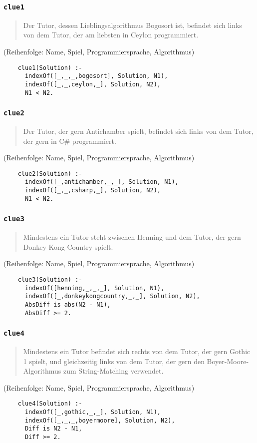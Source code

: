 \documentclass{beamer}
\begin{document}
\begin{frame}[fragile]
  \prolog
  \frametitle{\lstinline{clue1}}
  \begin{quote}
    Der Tutor, dessen Lieblingsalgorithmus Bogosort ist, befindet sich links von dem Tutor, der am liebsten in Ceylon programmiert.
  \end{quote}
  \small{(Reihenfolge: Name, Spiel, Programmiersprache, Algorithmus)}
  \pause
  \begin{lstlisting}
    clue1(Solution) :-
      indexOf([_,_,_,bogosort], Solution, N1),
      indexOf([_,_,ceylon,_], Solution, N2),
      N1 < N2.
  \end{lstlisting}
\end{frame}

\begin{frame}[fragile]
  \prolog
  \frametitle{\lstinline{clue2}}
  \begin{quote}
    Der Tutor, der gern Antichamber spielt, befindet sich links von dem Tutor, der gern in C\# programmiert.
  \end{quote}
  \small{(Reihenfolge: Name, Spiel, Programmiersprache, Algorithmus)}
  \pause
  \begin{lstlisting}
    clue2(Solution) :-
      indexOf([_,antichamber,_,_], Solution, N1),
      indexOf([_,_,csharp,_], Solution, N2),
      N1 < N2.
  \end{lstlisting}
\end{frame}

\begin{frame}[fragile]
  \prolog
  \frametitle{\lstinline{clue3}}
  \begin{quote}
    Mindestens ein Tutor steht zwischen Henning und dem Tutor, der gern Donkey Kong Country spielt.    
  \end{quote}
  \small{(Reihenfolge: Name, Spiel, Programmiersprache, Algorithmus)}
  \pause
  \begin{lstlisting}
    clue3(Solution) :-
	  indexOf([henning,_,_,_], Solution, N1),
	  indexOf([_,donkeykongcountry,_,_], Solution, N2),
	  AbsDiff is abs(N2 - N1),
	  AbsDiff >= 2.
  \end{lstlisting}
\end{frame}

\begin{frame}[fragile]
  \prolog
  \frametitle{\lstinline{clue4}}
  \begin{quote}
    Mindestens ein Tutor befindet sich rechts von dem Tutor, der gern Gothic 1 spielt, und gleichzeitig links von dem Tutor, der gern den Boyer-Moore-Algorithmus zum String-Matching verwendet.
  \end{quote}
  \small{(Reihenfolge: Name, Spiel, Programmiersprache, Algorithmus)}
  \pause
  \begin{lstlisting}
    clue4(Solution) :-
	  indexOf([_,gothic,_,_], Solution, N1),
	  indexOf([_,_,_,boyermoore], Solution, N2),
	  Diff is N2 - N1,
	  Diff >= 2.
  \end{lstlisting}
\end{frame}
\end{document}
